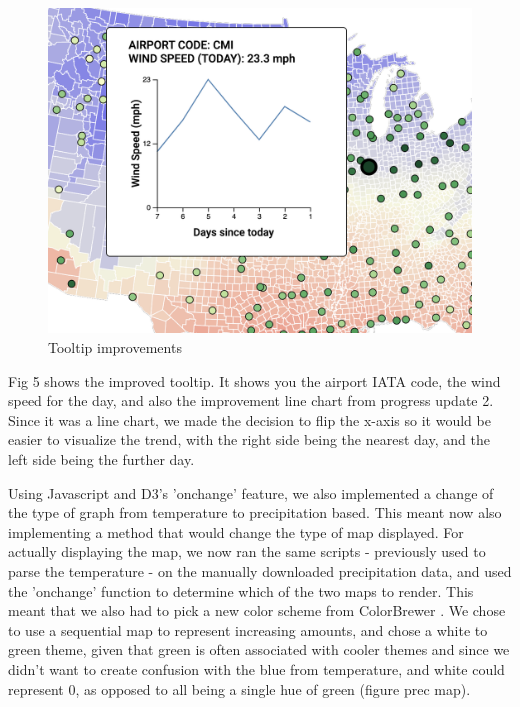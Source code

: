 \documentclass[10pt,twocolumn,twoside]{opticajnl}
\begin{document}
\begin{figure}
    \centering
    \includegraphics[scale=0.4]{images/img6.png}
    \caption{Tooltip improvements}
\end{figure}

Fig 5 shows the improved tooltip. It shows you the airport IATA code, the wind speed for the day, and also the improvement line chart from progress update 2. Since it was a line chart, we made the decision to flip the x-axis so it would be easier to visualize the trend, with the right side being the nearest day, and the left side being the further day.

Using Javascript and D3's 'onchange' feature, we also implemented a change of the type of graph from temperature to precipitation based. This meant now also implementing a method that would change the type of map displayed. For actually displaying the map, we now ran the same scripts - previously used to parse the temperature - on the manually downloaded precipitation data, and used the 'onchange' function to determine which of the two maps to render. This meant that we also had to pick a new color scheme from ColorBrewer \cite{colorbrewer}. We chose to use a sequential map to represent increasing amounts, and chose a white to green theme, given that green is often associated with cooler themes and since we didn't want to create confusion with the blue from temperature, and white could represent 0, as opposed to all being a single hue of green (figure prec map). 
\end{document}
